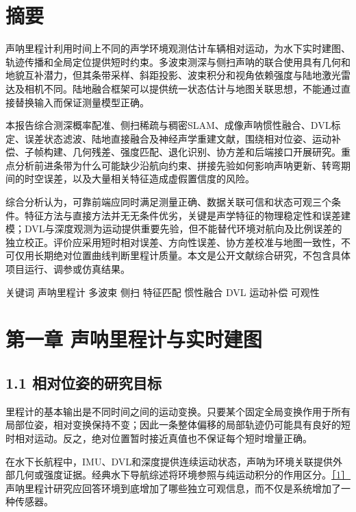 \hypertarget{ux6458ux8981}{%
\section{摘要}\label{ux6458ux8981}}

声呐里程计利用时间上不同的声学环境观测估计车辆相对运动，为水下实时建图、轨迹传播和全局定位提供短时约束。多波束测深与侧扫声呐的联合使用具有几何和地貌互补潜力，但其条带采样、斜距投影、波束积分和视角依赖强度与陆地激光雷达及相机不同。陆地融合框架可以提供统一状态估计与地图关联思想，不能通过直接替换输入而保证测量模型正确。

本报告综合测深概率配准、侧扫稀疏与稠密SLAM、成像声呐惯性融合、DVL标定、误差状态滤波、陆地直接融合及神经声学重建文献，围绕相对位姿、运动补偿、子帧构建、几何残差、强度匹配、退化识别、协方差和后端接口开展研究。重点分析前进条带为什么可能缺少沿航向约束、拼接先验如何影响声呐更新、转弯期间的时空误差，以及大量相关特征造成虚假置信度的风险。

综合分析认为，可靠前端应同时满足测量正确、数据关联可信和状态可观三个条件。特征方法与直接方法并无无条件优劣，关键是声学特征的物理稳定性和误差建模；DVL与深度观测为运动提供重要先验，但不能替代环境对航向及比例误差的独立校正。评价应采用短时相对误差、方向性误差、协方差校准与地图一致性，不可仅用长期绝对位置曲线判断里程计质量。本文是公开文献综合研究，不包含具体项目运行、调参或仿真结果。

关键词 声呐里程计 多波束 侧扫 特征匹配 惯性融合 DVL 运动补偿 可观性

\hypertarget{ux7b2cux4e00ux7ae0-ux58f0ux5450ux91ccux7a0bux8ba1ux4e0eux5b9eux65f6ux5efaux56fe}{%
\section{第一章 声呐里程计与实时建图}\label{ux7b2cux4e00ux7ae0-ux58f0ux5450ux91ccux7a0bux8ba1ux4e0eux5b9eux65f6ux5efaux56fe}}

\hypertarget{ux76f8ux5bf9ux4f4dux59ffux7684ux7814ux7a76ux76eeux6807}{%
\subsection{1.1 相对位姿的研究目标}\label{ux76f8ux5bf9ux4f4dux59ffux7684ux7814ux7a76ux76eeux6807}}

里程计的基本输出是不同时间之间的运动变换。只要某个固定全局变换作用于所有局部位姿，相对变换保持不变；因此一条整体偏移的局部轨迹仍可能具有良好的短时相对运动。反之，绝对位置暂时接近真值也不保证每个短时增量正确。

在水下长航程中，IMU、DVL和深度提供连续运动状态，声呐为环境关联提供外部几何或强度证据。经典水下导航综述将环境参照与纯运动积分的作用区分。\href{https://people.csail.mit.edu/lpaull/publications/Paull_JOE_2014.pdf}{［1］} 声呐里程计研究应回答环境到底增加了哪些独立可观信息，而不仅是系统增加了一种传感器。

